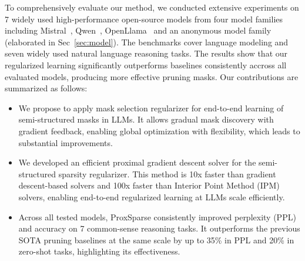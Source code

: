 To comprehensively evaluate our method, we conducted extensive experiments on 7 widely used high-performance open-source models from four model families including Mistral~\cite{jiang2023mistral}, Qwen~\cite{yang2024qwen2}, OpenLlama~\cite{openlm2023openllama} and an anonymous model family (elaborated in Sec~\ref{sec:model}). The benchmarks cover language modeling and seven widely used natural language reasoning tasks. The results show that our regularized learning significantly outperforms baselines consistently accross all evaluated models, producing more effective pruning masks. Our contributions are summarized as follows:


\begin{itemize}
\vspace{-1em}
\item We propose to apply mask selection regularizer for end-to-end learning of semi-structured masks in LLMs. It allows gradual mask discovery with gradient feedback, enabling global optimization with flexibility, which leads to substantial improvements.

\vspace{-0.5em}

\item We developed an efficient proximal gradient descent solver for the semi-structured sparsity regularizer. This method is 10x faster than gradient descent-based solvers and 100x faster than Interior Point Method (IPM) solvers, enabling end-to-end regularized learning at LLMs scale efficiently.


\vspace{-0.5em}

\item Across all tested models, ProxSparse consistently improved perplexity (PPL) and accuracy on 7 common-sense reasoning tasks. It outperforms the previous SOTA pruning baselines at the same scale by up to 35\% in PPL and 20\% in zero-shot tasks, highlighting its effectiveness.




\end{itemize}